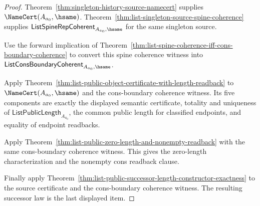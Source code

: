 \begin{proof}
Theorem~\ref{thm:singleton-history-source-namecert} supplies
$\NameCert(A_{a_0},\hsame)$. Theorem~\ref{thm:list-singleton-source-spine-coherence}
supplies $\mathsf{ListSpineRepCoherent}_{A_{a_0},\hsame}$ for the same
singleton source.

Use the forward implication of
Theorem~\ref{thm:list-spine-coherence-iff-cons-boundary-coherence} to convert
this spine coherence witness into
$\mathsf{ListConsBoundaryCoherent}_{A_{a_0},\hsame}$.

Apply Theorem~\ref{thm:list-public-object-certificate-with-length-readback} to
$\NameCert(A_{a_0},\hsame)$ and the cons-boundary coherence witness. Its five
components are exactly the displayed semantic certificate, totality and
uniqueness of $\mathsf{ListPublicLength}_{A_{a_0}}$, the common public length
for classified endpoints, and equality of endpoint readbacks.

Apply Theorem~\ref{thm:list-public-zero-length-and-nonempty-readback} with the
same cons-boundary coherence witness. This gives the zero-length
characterization and the nonempty cons readback clause.

Finally apply
Theorem~\ref{thm:list-public-successor-length-constructor-exactness} to the
source certificate and the cons-boundary coherence witness. The resulting
successor law is the last displayed item.
\end{proof}

